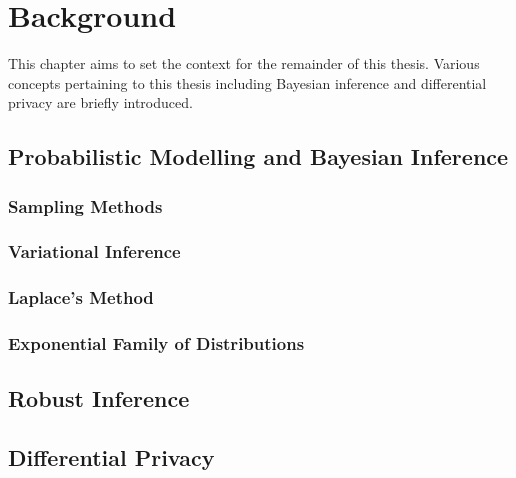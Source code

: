\chapter{Background}
\label{chap:chap2}

This chapter aims to set the context for the remainder of this thesis. Various concepts pertaining to this thesis including Bayesian inference and differential privacy are briefly introduced.

\section{Probabilistic Modelling and Bayesian Inference}
\label{sec:bbayesian-inference}

\subsection{Sampling Methods}
\label{subsec:bsampling-methods}

\subsection{Variational Inference}
\label{subsec:bvariational-inference}

\subsection{Laplace's Method}
\label{subsec:laplace-method}

\subsection{Exponential Family of Distributions}
\label{subsec:expfam}

\section{Robust Inference}
\label{sec:brobust-inference}

\section{Differential Privacy}
\label{sec:bdifferential-privacy}






